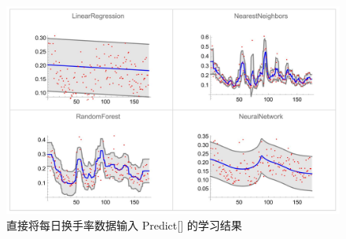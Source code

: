 \documentclass{ctexart}
\newcommand{\0}{\boldsymbol{0}}
\begin{document}
\begin{figure}[ht]
    \centering
    \includegraphics[width=1\textwidth]{learn.jpeg}
    \caption{\kaishu 直接将每日换手率数据输入 Predict[] 的学习结果}
    \label{fig:learnfail}
\end{figure}
\end{document}
